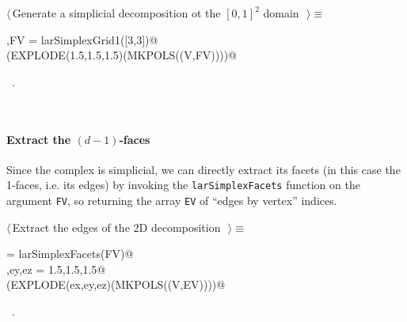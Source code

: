 \documentclass[11pt,oneside]{article}	%
\begin{document}
\begin{flushleft} \small
\begin{minipage}{\linewidth} \label{scrap11}
$\langle\,$Generate a simplicial decomposition ot the $[0,1]^2$ domain\nobreak\ {\footnotesize {}}$\,\rangle\equiv$
\vspace{-1ex}
\begin{list}{}{} \item
\mbox{}\verb@V,FV = larSimplexGrid1([3,3])@\\
\mbox{}\verb@VIEW(EXPLODE(1.5,1.5,1.5)(MKPOLS((V,FV))))@\\
\mbox{}\verb@@{\NWsep}
\end{list}
\vspace{-1ex}
\footnotesize\addtolength{\baselineskip}{-1ex}
\begin{list}{}{\setlength{\itemsep}{-\parsep}\setlength{\itemindent}{-\leftmargin}}
\item \NWtxtMacroRefIn\ .
\end{list}
\end{minipage}\\[4ex]
\end{flushleft}
\paragraph{Extract the $(d-1)$-faces}
Since the complex is simplicial, we can directly extract its facets (in this case the 1-faces, i.e. its edges) by invoking the \texttt{larSimplexFacets} function on the argument \texttt{FV}, so returning the array \texttt{EV} of ``edges by vertex'' indices. 

\begin{flushleft} \small
\begin{minipage}{\linewidth} \label{scrap12}
$\langle\,$Extract the edges of the 2D decomposition\nobreak\ {\footnotesize {}}$\,\rangle\equiv$
\vspace{-1ex}
\begin{list}{}{} \item
\mbox{}\verb@EV = larSimplexFacets(FV)@\\
\mbox{}\verb@ex,ey,ez = 1.5,1.5,1.5@\\
\mbox{}\verb@VIEW(EXPLODE(ex,ey,ez)(MKPOLS((V,EV))))@\\
\mbox{}\verb@@{\NWsep}
\end{list}
\vspace{-1ex}
\footnotesize\addtolength{\baselineskip}{-1ex}
\begin{list}{}{\setlength{\itemsep}{-\parsep}\setlength{\itemindent}{-\leftmargin}}
\item \NWtxtMacroRefIn\ .
\end{list}
\end{minipage}\\[4ex]
\end{flushleft}
\end{document}
